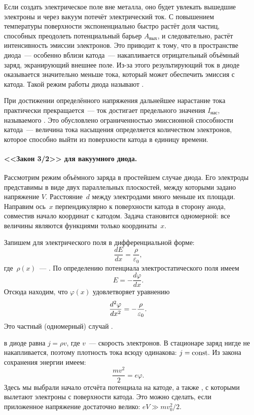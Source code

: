 Если создать электрическое поле вне металла, оно будет увлекать вышедшие
электроны и через вакуум потечёт электрический ток.
С повышением температуры поверхности экспоненциально быстро растёт доля частиц,
способных преодолеть потенциальный барьер $A_{вых}$,
и следовательно, растёт интенсивность эмиссии электронов. Это приводит к тому,
что
в пространстве диода~--- особенно вблизи катода~--- накапливается отрицательный
объёмный заряд, экранирующий внешнее поле. Из-за этого результирующий ток
в диоде оказывается значительно меньше тока, который может обеспечить
эмиссия с катода. Такой режим работы диода называют .

При достижении определённого напряжения дальнейшее нарастание тока практически
прекращается~--- ток достигает предельного значения $I_{нас}$, называемого
. Это обусловлено ограниченностью эмиссионной способности
катода~--- величина тока насыщения определяется количеством электронов,
которое способно выйти из поверхности катода в единицу времени.

\paragraph{<<Закон 3/2>> для вакуумного диода.}
Рассмотрим режим объёмного заряда в простейшем случае 
диода.
Его электроды представимы в виде двух параллельных плоскостей,
между которыми задано напряжение $V$. Расстояние~$d$ между электродами много
меньше их площади. Направим ось~$x$ перпендикулярно к поверхности катода
в сторону анода, совместив начало координат с катодом. Задача
становится одномерной: все величины являются функциями только координаты~$x$.

Запишем для электрического поля  в дифференциальной
форме:
\[
\frac{dE}{dx} = \frac{\rho}{\varepsilon_0},
\]
где~$\rho(x)$~--- . По определению
потенциала электростатического поля имеем
\[
E = -\frac{d\varphi}{dx}.
\]
Отсюда находим, что $\varphi(x)$ удовлетворяет уравнению
\begin{equation}
    \eqmark{3.14}
    \frac{d^2\varphi}{dx^2}=-\frac{\rho}{\varepsilon_0}.
\end{equation}
Это частный (одномерный) случай .

 в диоде равна $j=\rho v$, где $v$~--- скорость
электронов. В стационаре заряд нигде не накапливается, поэтому плотность тока
всюду одинакова: $j=\mathrm{const}$. Из закона сохранения энергии имеем:
\begin{equation*}
    \frac{mv^2}{2}=e\varphi.
\end{equation*}
Здесь мы выбрали начало отсчёта потенциала на катоде, а также
,
с которыми вылетают электроны с поверхности катода. Это можно сделать, если
приложенное напряжение достаточно велико: $eV\gg mv_0^2/2$.


